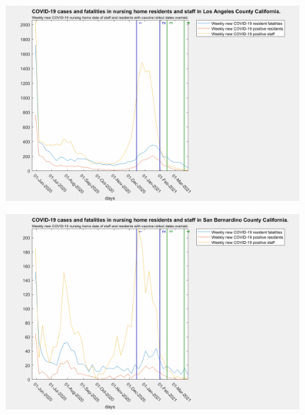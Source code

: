 \documentclass[twoside]{article}
\begin{document}
\begin{multicols}{2}
\begin{figure}[H]
	\includegraphics[width=\linewidth]{images/losangeles_nursing_home_with_vaccine.png}
	\caption{}
	\label{fig:images/losangeles_nursing_home_with_vaccineLabel}
\end{figure}

\begin{figure}[H]
	\includegraphics[width=\linewidth]{images/sanbernardino_nursing_home_with_vaccine.png}
	\caption{}
	\label{fig:images/sanbernardino_nursing_home_with_vaccineLabel}
\end{figure}


\end{multicols}
\end{document}
